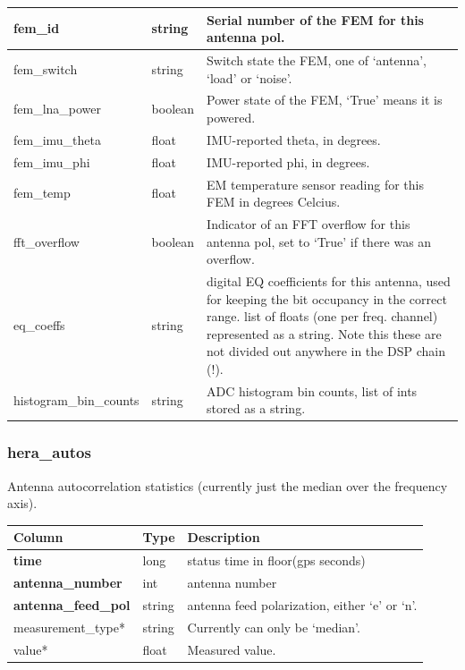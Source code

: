 \documentclass{article}
\begin{document}
{\begin{center}
\begin{tabular}{| p{4cm} | p{2cm} | p{10cm} |}
fem\_id & string & Serial number of the FEM for this antenna pol. \\ \hline
fem\_switch & string & Switch state the FEM, one of `antenna', `load' or `noise'. \\ \hline
fem\_lna\_power & boolean & Power state of the FEM, `True' means it is powered. \\ \hline
fem\_imu\_theta & float & IMU-reported theta, in degrees. \\ \hline
fem\_imu\_phi & float & IMU-reported phi, in degrees. \\ \hline
fem\_temp & float & EM temperature sensor reading for this FEM in degrees Celcius. \\ \hline
fft\_overflow & boolean & Indicator of an FFT overflow for this antenna pol, set to `True' if there was an overflow. \\ \hline
eq\_coeffs & string & digital EQ coefficients for this antenna, used for keeping the bit occupancy in the
            correct range. list of floats (one per freq. channel) represented as a string. Note this these are
            not divided out anywhere in the DSP chain (!). \\\hline
histogram\_bin\_counts & string & ADC histogram bin counts, list of ints stored as a string. \\ \hline
\end{tabular}
\end{center}

\subsubsection{hera\_autos}
Antenna autocorrelation statistics (currently just the median over the frequency axis).
\begin{center}
\begin{tabular}{| p{4cm} | p{2cm} | p{10cm} |}
\hline
 {\bf Column} & {\bf Type}  & {\bf Description} \\ [0.5ex]  \hline\hline
\textbf{time} & long & status time in floor(gps seconds)\\ \hline
\textbf{antenna\_number} & int & antenna number \\ \hline
\textbf{antenna\_feed\_pol} & string & antenna feed polarization, either `e' or `n'. \\ \hline
measurement\_type* & string & Currently can only be `median'. \\ \hline
value* & float & Measured value. \\ \hline
\end{tabular}
\end{center}


}
\end{document}
